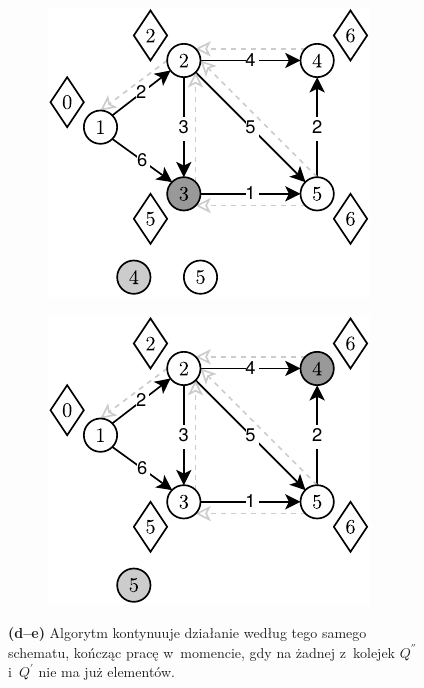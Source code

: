 \begin{figure}[!htbp]
	\ContinuedFloat
	\centering
	\begin{subfigure}[b]{0.28\textwidth}
		\includegraphics[width=\textwidth]{Chapter_III/GRAPH-GROWTH-2Q-Example/d.pdf}
		\caption{}
	\end{subfigure}
	\qquad	\qquad
	\begin{subfigure}[b]{0.28\textwidth}
		\includegraphics[width=\textwidth]{Chapter_III/GRAPH-GROWTH-2Q-Example/e.pdf}
		\caption{}
	\end{subfigure}
	\caption{ \textbf{(d--e)} Algorytm kontynuuje działanie według tego samego schematu, kończąc pracę w~momencie, gdy na żadnej z~kolejek $Q^{''}$ i~$Q^{'}$ nie ma już elementów. } \label{fig:exampleDQQ2}
\end{figure}


